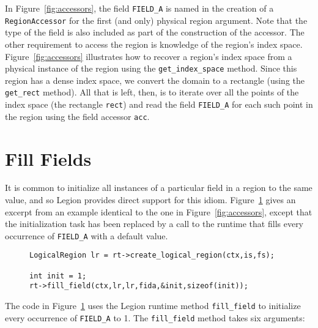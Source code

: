 In Figure~\ref{fig:accessors}, the field
{\tt FIELD\_A} is named in the creation of a {\tt RegionAccessor} for the first (and only) physical region argument.
Note that the type of the field is also included as part of the construction of the accessor.
The other requirement to access the region is knowledge of the region's index space.  Figure~\ref{fig:accessors}
illustrates how to recover a region's index space from a physical instance of the region using the {\tt get\_index\_space} method.
Since this region has a dense index space, we convert the domain to a rectangle (using the {\tt get\_rect} method).
All that is left, then, is to iterate over all the points of the index space (the rectangle {\tt rect}) and read the
field {\tt FIELD\_A} for each such point in the region using the field accessor {\tt acc}.

\section{Fill Fields}
\label{sec:fill}

It is common to initialize all instances of a particular field in a region to the same value, and so Legion
provides direct support for this idiom.  Figure~\ref{fig:fill} gives an excerpt from an example identical
to the one in Figure~\ref{fig:accessors}, except that the initialization task has been replaced by a call to
the runtime that fills every occurrence of {\tt FIELD\_A} with a default value.

\begin{figure}
{\small
\begin{lstlisting}
LogicalRegion lr = rt->create_logical_region(ctx,is,fs);

int init = 1;
rt->fill_field(ctx,lr,lr,fida,&init,sizeof(init));
\end{lstlisting}
}
\caption{}
\label{fig:fill}
\end{figure}
The code in Figure~\ref{fig:fill} uses the Legion runtime method {\tt fill\_field} to initialize every 
occurrence of {\tt FIELD\_A} to 1.  The {\tt fill\_field} method takes six arguments:

